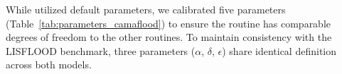 \documentclass[hess, manuscript]{copernicus}
\providecommand{\DIFdelbegin}{} %
\providecommand{\DIFdelend}{} %
\begin{document}
\DIFdelbegin %



\DIFdelend While \citet{Hanazaki2022} utilized default parameters, we calibrated five parameters (Table~\ref{tab:parameters_camaflood}) to ensure the routine has comparable degrees of freedom to the other routines. To maintain consistency with the LISFLOOD benchmark, three parameters ($\alpha$, $\delta$, $\epsilon$) share identical definition across both models.
\end{document}

